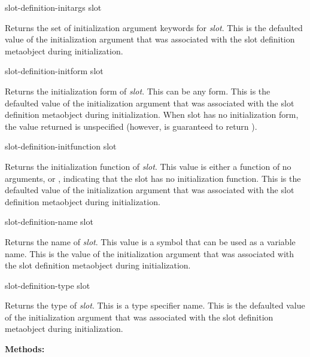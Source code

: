 \begin{defun}
slot-definition-initargs slot

Returns the set of initialization argument keywords for \emph{slot}. This is the
defaulted value of the  initialization argument that was
associated with the slot definition metaobject during initialization.
\end{defun}

\begin{defun}
slot-definition-initform slot

Returns the initialization form of \emph{slot}. This can be any form. This is
the defaulted value of the  initialization argument that was
associated with the slot definition metaobject during initialization. When slot
has no initialization form, the value returned is unspecified (however,
 is guaranteed to return ).
\end{defun}

\begin{defun}
slot-definition-initfunction slot

Returns the initialization function of \emph{slot}. This value is either a function of
no arguments, or , indicating that the slot has no initialization
function. This is the defaulted value of the  initialization
argument that was associated with the slot definition metaobject during
initialization.
\end{defun}

\begin{defun}
slot-definition-name slot

Returns the name of \emph{slot}. This value is a symbol that can be used as a
variable name. This is the value of the  initialization argument that
was associated with the slot definition metaobject during initialization.
\end{defun}

\begin{defun}
slot-definition-type slot

Returns the type of \emph{slot}. This is a type specifier name. This is the
defaulted value of the  initialization argument that was associated
with the slot definition metaobject during initialization.
\end{defun}

\textbf{Methods:}

